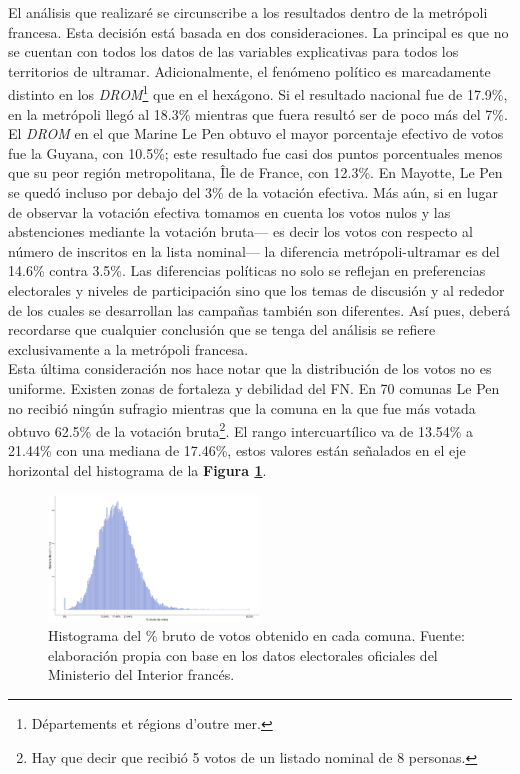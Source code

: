 El análisis que realizaré se circunscribe a los resultados dentro de la metrópoli francesa. Esta decisión está basada en dos consideraciones. La principal es que no se cuentan con todos los datos de las variables explicativas para todos los territorios de ultramar. Adicionalmente, el fenómeno político es marcadamente distinto en los \textit{DROM}\footnote{Départements et régions d'outre mer.} que en el hexágono. Si el resultado nacional fue de 17.9\%, en la metrópoli llegó al 18.3\% mientras que fuera resultó ser de poco más del 7\%. El \textit{DROM} en el que Marine Le Pen obtuvo el mayor porcentaje efectivo de votos fue la Guyana, con 10.5\%; este resultado fue casi dos puntos porcentuales menos que su peor región metropolitana, Île de France, con 12.3\%. En Mayotte, Le Pen se quedó incluso por debajo del 3\% de la votación efectiva. Más aún, si en lugar de observar la votación efectiva tomamos en cuenta los votos nulos y las abstenciones mediante la votación bruta--- es decir los votos con respecto al número de inscritos en la lista nominal--- la diferencia metrópoli-ultramar es del 14.6\% contra 3.5\%. Las diferencias políticas no solo se reflejan en preferencias electorales y niveles de participación sino que los temas de discusión y al rededor de los cuales se desarrollan las campañas también son diferentes. Así pues, deberá recordarse que cualquier conclusión que se tenga del análisis se refiere exclusivamente a la metrópoli francesa.\\

Esta última consideración nos hace notar que la distribución de los votos no es uniforme. Existen zonas de fortaleza y debilidad del FN. En 70 comunas Le Pen no recibió ningún sufragio mientras que la comuna en la que fue más votada obtuvo 62.5\% de la votación bruta\footnote{Hay que decir que recibió 5 votos de un listado nominal de 8 personas.}. El rango intercuartílico va de 13.54\% a 21.44\% con una mediana de 17.46\%, estos valores están señalados en el eje horizontal del histograma de la \textbf{Figura \ref{fig:Distr_Br}}.\\ 

\begin{figure}[h]
	\centering
	\includegraphics[width = 0.5\textwidth]{Figs/AED/Distr_Votos_Br_P12_FN}
	\caption{Histograma del \% bruto de votos obtenido en cada comuna. Fuente: elaboración propia con base en los datos electorales oficiales del Ministerio del Interior francés.}
	\label{fig:Distr_Br}	
\end{figure}

